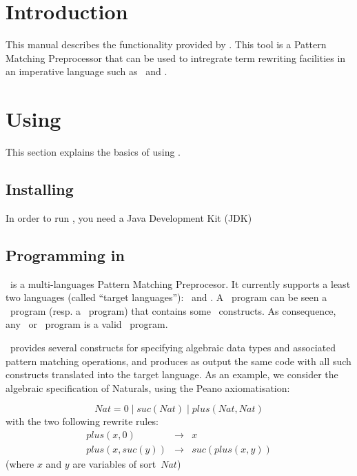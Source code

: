 \section{Introduction}

This manual describes the functionality provided by \TOM. 
This tool is a Pattern Matching Preprocessor that can be used to
intregrate term rewriting facilities in an imperative language such as
\C\ and \Java.

\section{Using \TOM}

This section explains the basics of using \TOM. 

\subsection{Installing \TOM}
In order to run \TOM, you need a Java Development Kit (JDK)

\subsection{Programming in \TOM}
\TOM\ is a multi-languages Pattern Matching Preprocesor. It currently
supports a least two languages (called ``target languages''): \C\ and \Java.
A \TOM\ program can be seen a \Java\ program (resp. a \C\ program)
that contains some \TOM\ constructs. As consequence, any \Java\ or \C\
program is a valid \TOM\ program. 

\TOM\ provides several constructs for specifying algebraic data types
and associated pattern matching operations, and produces as output the
same code with all such constructs translated into the target language.
As an example, we consider the algebraic specification of Naturals,
using the Peano axiomatisation:

$$
Nat = 0 \mid suc(Nat) \mid plus(Nat,Nat)
$$
with the two following rewrite rules:
$$
\begin{array}{lcl}
  plus(x,0)      & \rightarrow & x\\
  plus(x,suc(y)) & \rightarrow & suc(plus(x,y))
\end{array}
$$
(where $x$ and $y$ are variables of sort~$Nat$)

